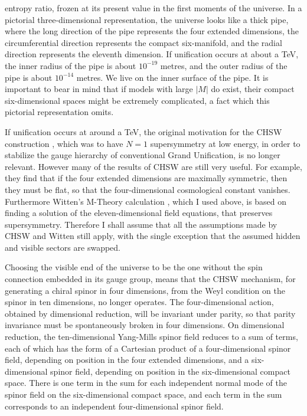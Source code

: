 \documentclass[a4paper,12pt,oneside]{article}
\begin{document}
entropy ratio, frozen at its present value in the first moments of
the universe.  In a pictorial three-dimensional representation, the
universe looks like a thick pipe, where the long direction 
of the pipe represents the four extended dimensions, the 
circumferential direction represents the 
compact six-manifold, and the radial direction represents the 
eleventh 
dimension.  If unification occurs at about a TeV, the inner radius 
of the pipe is about $10^{-19}$ 
metres, and the outer radius of the pipe is about $10^{-14}$ 
metres.  We live on the inner surface of the pipe.  It is important 
to bear in mind that if models with large $\vert M\vert$ do exist, 
their compact six-dimensional spaces might be extremely complicated,
a fact which this pictorial representation omits.

If unification occurs at around a TeV, the original motivation for
the CHSW construction \cite{CHSW}, which was to have $N = 1$ 
supersymmetry at low energy, in order to stabilize the gauge 
hierarchy of conventional Grand Unification, is no longer relevant.
However many of the results of CHSW are still very useful.
For example, they find that if the four extended dimensions are
maximally symmetric, then they must be flat, so that the 
four-dimensional cosmological constant vanishes.  Furthermore 
Witten's M-Theory calculation \cite{Witten}, which I used above, is
based on finding a solution of the eleven-dimensional field 
equations, that preserves supersymmetry.  Therefore I shall assume
that all the assumptions made by CHSW and Witten still apply, with
the single exception that the assumed hidden and visible sectors are
swapped.

Choosing the visible end of the universe to be the one without the
spin connection embedded in its gauge group, means that the CHSW
mechanism, for generating a chiral spinor in four dimensions, from 
the Weyl condition on the spinor in ten dimensions, no longer
operates.  The four-dimensional action, obtained by dimensional
reduction, will be invariant under parity, so that parity invariance
must be spontaneously broken in four dimensions.  On dimensional 
reduction, the ten-dimensional Yang-Mills spinor field reduces to a 
sum of terms, each of which has the form of a Cartesian product of 
a four-dimensional spinor field, depending on position in the four 
extended dimensions, and a six-dimensional spinor field, depending 
on position in the six-dimensional compact space.  There is one 
term in the sum for each independent normal mode of the spinor 
field on the six-dimensional compact space, and each term in the 
sum corresponds to an independent four-dimensional spinor field.
\end{document}

